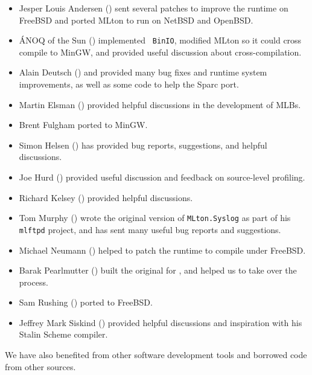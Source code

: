 \begin{itemize}

\item
Jesper Louis Andersen () sent several patches
to improve the runtime on FreeBSD and ported MLton to run on NetBSD
and OpenBSD.

\item
\'{A}NOQ of the Sun () implemented {\tt
BinIO}, modified MLton so it could cross compile to MinGW, and provided useful
discussion about cross-compilation.

\item
Alain Deutsch () and  provided many bug fixes and
runtime system improvements, as well as some code to help the Sparc
port.

\item
Martin Elsman () provided helpful discussions in the 
development of MLBs.

\item
Brent Fulgham ported {\mlton} to MinGW.

\item
Simon Helsen () has provided bug reports, suggestions,
and helpful discussions.

\item
Joe Hurd () provided useful discussion
and feedback on source-level profiling.

\item
Richard Kelsey () provided helpful
discussions.

\item
Tom Murphy () wrote the original version
of {\tt MLton.Syslog} as part of his {\tt mlftpd} project, and has
sent many useful bug reports and suggestions.

\item
Michael Neumann () helped to patch the runtime
to compile under FreeBSD.

\item
Barak Pearlmutter () built the original
for {\mlton}, and helped us to take over the process.

\item
Sam Rushing () ported {\mlton} to FreeBSD.

\item
Jeffrey Mark Siskind () provided helpful discussions
and inspiration with his Stalin Scheme compiler.

\end{itemize}
We have also benefited from other software development tools and borrowed code
from other sources.

